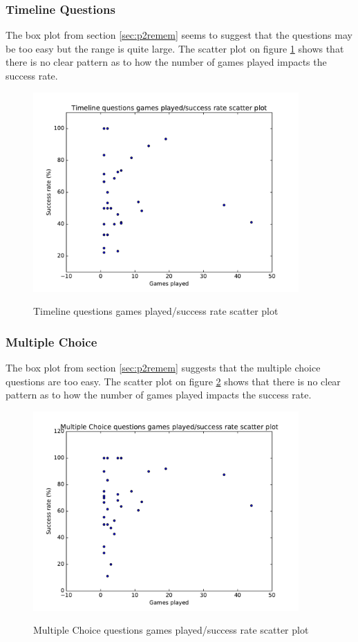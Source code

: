 \subsubsection{Timeline Questions}
The box plot from section \ref{sec:p2remem} seems to suggest that the questions may be too easy but the range is quite large. The scatter plot on figure \ref{fig:timeScatter} shows that there is no clear pattern as to how the number of games played impacts the success rate.
\begin{figure}
\centering
{\includegraphics[width=4in]{images/timeline_scatter.pdf}}
\caption{Timeline questions games played/success rate scatter plot}
\label{fig:timeScatter}
\end{figure}

\subsubsection{Multiple Choice}
The box plot from section \ref{sec:p2remem} suggests that the multiple choice questions are too easy. The scatter plot on figure \ref{fig:mcScatter} shows that there is no clear pattern as to how the number of games played impacts the success rate.
\begin{figure}
\centering
{\includegraphics[width=4in]{images/mc_scatter.pdf}}
\caption{Multiple Choice questions games played/success rate scatter plot}
\label{fig:mcScatter}
\end{figure}
